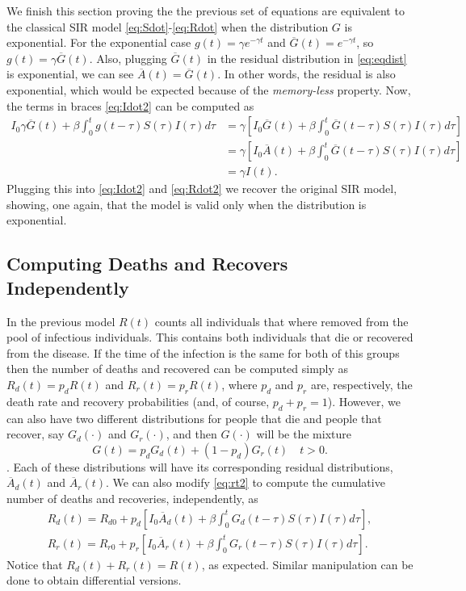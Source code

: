 \documentclass[twoside,USenglish,10pt]{article}
\newcommand{\Ab}{\overline{A}\xspace}
\newcommand{\Gb}{\overline{G}\xspace}
\begin{document}
We finish this section proving the the previous set of equations are equivalent to the classical SIR model \eqref{eq:Sdot}-\eqref{eq:Rdot} when the distribution $G$ is exponential. 
For the exponential case  $g(t)=\gamma e^{-\gamma t}$ and $\Gb(t)=e^{-\gamma t}$, so $g(t)=\gamma\Gb(t)$. Also, plugging $\Gb(t)$ in the residual distribution in \eqref{eq:eqdist} is exponential, we can see $\Ab(t) = \Gb(t)$. In other words, the residual is also exponential, which would be expected because of the \textit{memory-less} property.
Now, the terms in braces \eqref{eq:Idot2} can be computed as 
\begin{align}
I_0 \gamma \Gb(t) + \beta\int_0^t g(t-\tau) S(\tau)I(\tau)d\tau 
&= \gamma\left[ I_0  \Gb(t) + \beta\int_0^t \Gb(t-\tau) S(\tau)I(\tau)d\tau \right]\\
&= \gamma\left[ I_0  \Ab(t) + \beta\int_0^t \Gb(t-\tau) S(\tau)I(\tau)d\tau \right]\\
&= \gamma I(t).
\end{align}
Plugging this into \eqref{eq:Idot2} and \eqref{eq:Rdot2} we recover the original SIR model, showing, one again, that the model is valid only when the distribution is exponential.

\subsection{Computing Deaths and Recovers Independently}

In the previous model $R(t)$ counts all individuals that where removed from the pool of infectious individuals. This contains both individuals that die or recovered from the disease. If the time of the infection is the same for both of this groups then the number of deaths and recovered can be computed simply as $R_d(t)=p_dR(t)$ and $R_r(t)=p_rR(t)$, where $p_d$ and $p_r$ are, respectively, the death rate and recovery probabilities (and, of course, $p_d+p_r=1$).
However, we can also have  two different distributions for people that die and people that recover, say $G_d(\cdot)$ and $G_r(\cdot)$, and then $G(\cdot)$ will be the mixture
\[ G(t) = p_dG_d(t) + (1-p_d)G_r(t) \quad t>0.\]. Each of these distributions will have its corresponding residual distributions, $\Ab_d(t)$ and $\Ab_r(t)$.
We can also modify \eqref{eq:rt2} to compute the cumulative number of deaths and recoveries, independently, as
\begin{equation*}
	\begin{gathered}
		R_d(t) = R_{d0} + p_d[I_0\Ab_d(t) + \beta \int_0^t G_d(t-\tau) S(\tau)I(\tau)d\tau], \\
		R_r(t) = R_{r0} + p_r[I_0\Ab_r(t) + \beta \int_0^t G_r(t-\tau) S(\tau)I(\tau)d\tau].  
	\end{gathered}
\end{equation*}
Notice that $R_d(t) + R_r(t) = R(t)$, as expected. Similar manipulation can be done to obtain differential versions.
\end{document}
